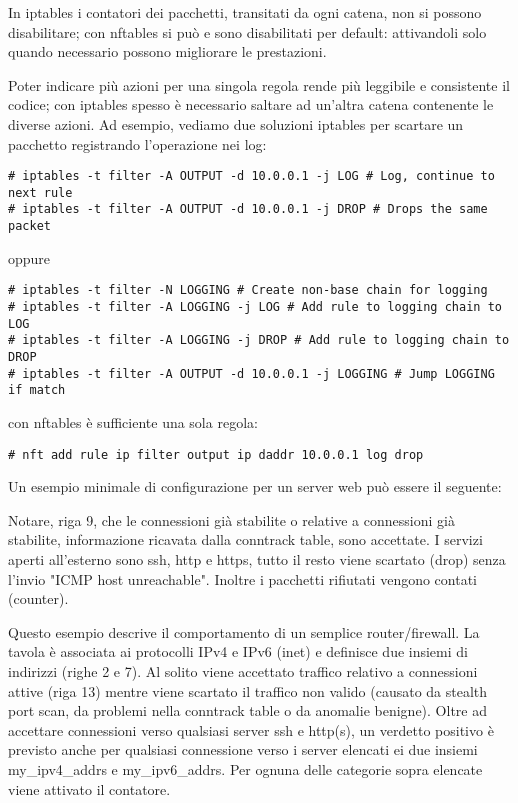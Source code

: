 In iptables i contatori dei pacchetti, transitati da ogni catena, non si
possono disabilitare; con nftables si pu\`o e sono disabilitati per default:
attivandoli solo quando necessario possono migliorare le prestazioni.

Poter indicare pi\`u azioni per una singola regola rende pi\`u leggibile e
consistente il codice; con iptables spesso è necessario saltare ad un'altra
catena contenente le diverse azioni. Ad esempio, vediamo due soluzioni
iptables per scartare un pacchetto registrando l'operazione
nei log: 

\begin{lstlisting}
# iptables -t filter -A OUTPUT -d 10.0.0.1 -j LOG # Log, continue to next rule
# iptables -t filter -A OUTPUT -d 10.0.0.1 -j DROP # Drops the same packet
\end{lstlisting}
oppure 
\begin{lstlisting}
# iptables -t filter -N LOGGING # Create non-base chain for logging
# iptables -t filter -A LOGGING -j LOG # Add rule to logging chain to LOG
# iptables -t filter -A LOGGING -j DROP # Add rule to logging chain to DROP
# iptables -t filter -A OUTPUT -d 10.0.0.1 -j LOGGING # Jump LOGGING if match
\end{lstlisting}
con nftables \`e sufficiente una sola regola:
\begin{lstlisting}
# nft add rule ip filter output ip daddr 10.0.0.1 log drop
\end{lstlisting}
Un esempio minimale di configurazione per un server web pu\`o essere
il seguente:

Notare, riga 9, che le connessioni già stabilite o relative a
connessioni già stabilite, informazione ricavata dalla conntrack table,
sono accettate.
I servizi aperti all'esterno sono ssh, http e https, tutto il resto
viene scartato (drop) senza l'invio "ICMP host unreachable". Inoltre i
pacchetti rifiutati vengono contati (counter).


Questo esempio descrive il comportamento di un semplice
router/firewall. La tavola è associata ai protocolli IPv4 e IPv6 (inet) e
definisce due insiemi di indirizzi (righe 2 e 7).
Al solito viene accettato traffico relativo a connessioni attive (riga 13)
mentre viene scartato il traffico non valido (causato da stealth port scan, da
problemi nella conntrack table o da anomalie benigne).
Oltre ad accettare connessioni verso qualsiasi server ssh e http(s), un
verdetto positivo è previsto anche per qualsiasi connessione verso i server
elencati ei due insiemi my\_ipv4\_addrs e my\_ipv6\_addrs.
Per ognuna delle categorie sopra elencate viene attivato il contatore.

